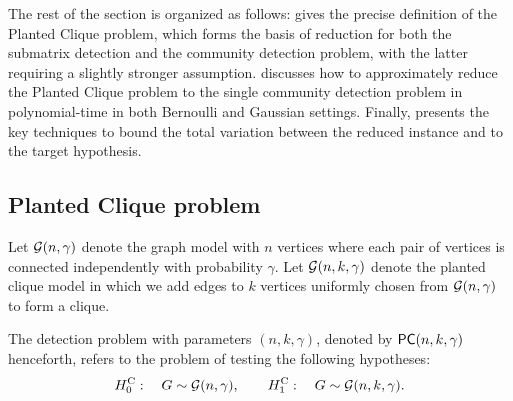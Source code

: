The rest of the section is organized as follows:
 gives the precise definition of the Planted Clique problem, which forms the basis of reduction for both the submatrix detection and the community detection problem, with the latter requiring a slightly stronger assumption. 
 discusses how to approximately reduce the Planted Clique problem to
the single community detection problem in polynomial-time in both Bernoulli and Gaussian settings.  
Finally,  presents the key techniques to bound the total variation between the reduced instance and to the target hypothesis.


	\subsection{Planted Clique problem}
	\label{sec:comp-pc}
	
	
	
	
	Let ${\mathcal{G}}(n,\gamma)$  denote the \ER graph model with $n$ vertices where each pair of vertices is connected independently with probability $\gamma$.	
	Let ${\mathcal{G}}(n,k,\gamma)$ denote the planted clique model in which we add edges to $k$ vertices uniformly chosen from ${\mathcal{G}}(n,\gamma)$ to form a clique.
\begin{definition}\label{def:PlantedCliqueDetection}
The \PC detection problem with parameters $(n,k,\gamma)$, denoted by ${\sf PC}(n,k,\gamma)$ henceforth, refers to the problem of testing the following hypotheses:
 \begin{align*}
H^{\rm C}_0: \quad  G \sim \mathcal{G}(n,\gamma),  \quad \quad H^{\rm C}_1: \quad  G \sim \mathcal{G}(n,k,\gamma).
\end{align*}
\end{definition}

